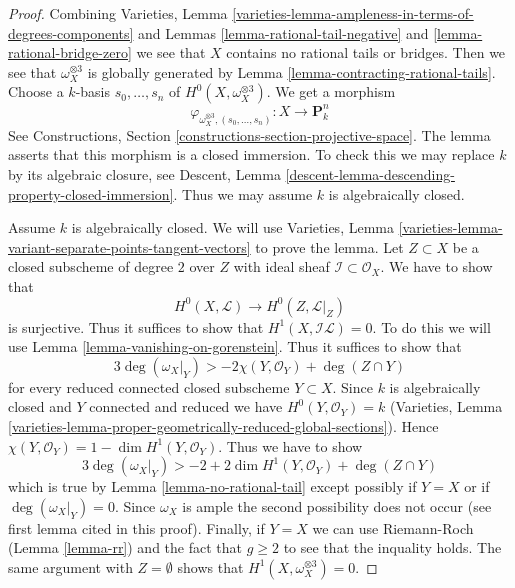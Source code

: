 \documentclass[10pt,a4paper]{amsart}
\theoremstyle{plain}
\theoremstyle{definition}
\theoremstyle{remark}
\numberwithin{equation}{subsection}
\begin{document}
\begin{proof}
Combining Varieties, Lemma
\ref{varieties-lemma-ampleness-in-terms-of-degrees-components} and
Lemmas \ref{lemma-rational-tail-negative} and \ref{lemma-rational-bridge-zero}
we see that $X$ contains no rational tails or bridges.
Then we see that $\omega_X^{\otimes 3}$ is globally generated
by Lemma \ref{lemma-contracting-rational-tails}.
Choose a $k$-basis $s_0, \ldots, s_n$ of
$H^0(X, \omega_X^{\otimes 3})$. We get a morphism
$$
\varphi_{\omega_X^{\otimes 3}, (s_0, \ldots, s_n)} :
X \longrightarrow \mathbf{P}^n_k
$$
See Constructions, Section \ref{constructions-section-projective-space}.
The lemma asserts that this morphism is a closed immersion.
To check this we may replace $k$ by its algebraic closure, see
Descent, Lemma \ref{descent-lemma-descending-property-closed-immersion}.
Thus we may assume $k$ is algebraically closed.

\medskip\noindent
Assume $k$ is algebraically closed.
We will use Varieties, Lemma
\ref{varieties-lemma-variant-separate-points-tangent-vectors}
to prove the lemma.
Let $Z \subset X$ be a closed subscheme of degree $2$ over $Z$
with ideal sheaf $\mathcal{I} \subset \mathcal{O}_X$.
We have to show that
$$
H^0(X, \mathcal{L}) \to H^0(Z, \mathcal{L}|_Z)
$$
is surjective. Thus it suffices to show that
$H^1(X, \mathcal{I}\mathcal{L}) = 0$.
To do this we will use Lemma \ref{lemma-vanishing-on-gorenstein}.
Thus it suffices to show that
$$
3\deg(\omega_X|_Y) > -2\chi(Y, \mathcal{O}_Y) + \deg(Z \cap Y)
$$
for every reduced connected closed subscheme $Y \subset X$.
Since $k$ is algebraically closed and $Y$ connected and reduced
we have $H^0(Y, \mathcal{O}_Y) = k$ (Varieties, Lemma
\ref{varieties-lemma-proper-geometrically-reduced-global-sections}).
Hence $\chi(Y, \mathcal{O}_Y) = 1 - \dim H^1(Y, \mathcal{O}_Y)$.
Thus we have to show
$$
3\deg(\omega_X|_Y) > -2 + 2\dim H^1(Y, \mathcal{O}_Y) + \deg(Z \cap Y)
$$
which is true by Lemma \ref{lemma-no-rational-tail}
except possibly if $Y = X$ or if $\deg(\omega_X|_Y) = 0$.
Since $\omega_X$ is ample the second possibility does not
occur (see first lemma cited in this proof). Finally, if
$Y = X$ we can use Riemann-Roch (Lemma \ref{lemma-rr})
and the fact that $g \geq 2$ to see that the inquality holds.
The same argument with $Z = \emptyset$ shows that
$H^1(X, \omega_X^{\otimes 3}) = 0$.
\end{proof}
\end{document}
